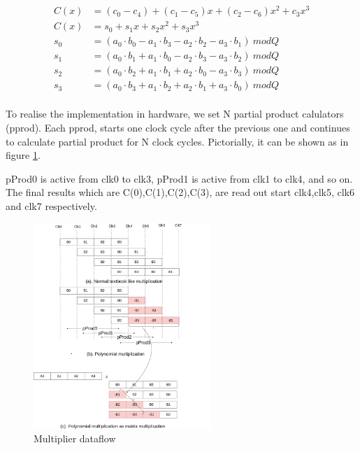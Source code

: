 \documentclass{article}
\begin{document}
    \begin{align}
      C(x) &= (c_0-c_4) + (c_1- c_5)x + (c_2- c_6)x^2 + c_3x^3  \\
      C(x) &= s_0 + s_1x + s_2x^2 + s_3x^3  \\
      s_0 &= (a_0 \cdot b_0 - a_1 \cdot b_3 - a_2 \cdot b_2 - a_3 \cdot b_1 )\ mod Q\\
      s_1 &= (a_0 \cdot b_1 + a_1 \cdot b_0 - a_2 \cdot b_3 - a_3 \cdot b_2 )\ mod Q\\
      s_2 &= (a_0 \cdot b_2 + a_1 \cdot b_1 + a_2 \cdot b_0 - a_3 \cdot b_3 )\ mod Q\\
      s_3 &= (a_0 \cdot b_3 + a_1 \cdot b_2 + a_2 \cdot b_1 + a_3 \cdot b_0 )\ mod Q\\
    \end{align} 
    
    To realise the implementation in hardware, we set N partial product calulators (pprod). Each pprod, starts one clock cycle
    after the previous one and continues to calculate partial product for N clock cycles. Pictorially, it can be shown as in figure \ref{fig:multiplier}. 
    
    pProd0 is active from clk0 to clk3, pProd1 is active from clk1 to clk4, and so on. 
    The final results which are C(0),C(1),C(2),C(3), are read out start clk4,clk5, clk6 and clk7 respectively.

    \begin{figure}[htp] 
      \centering
      \includegraphics[width=0.6\textwidth]{multiplier_func.png}
      \caption{Multiplier dataflow}
      \label{fig:multiplier} 
    \end{figure}
\end{document}
